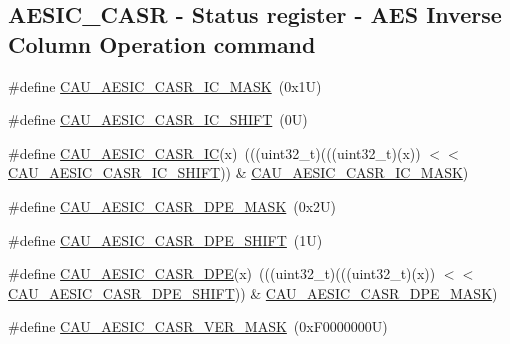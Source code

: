 \subsection*{A\+E\+S\+I\+C\+\_\+\+C\+A\+SR -\/ Status register -\/ A\+ES Inverse Column Operation command}
\begin{DoxyCompactItemize}
\item 
\#define \mbox{\hyperlink{group___c_a_u___register___masks_gacb80d3117440c08ed94005920ea5fb39}{C\+A\+U\+\_\+\+A\+E\+S\+I\+C\+\_\+\+C\+A\+S\+R\+\_\+\+I\+C\+\_\+\+M\+A\+SK}}~(0x1\+U)
\item 
\#define \mbox{\hyperlink{group___c_a_u___register___masks_gaea31527fd7f5ac33f8a4eacdb62ae8bd}{C\+A\+U\+\_\+\+A\+E\+S\+I\+C\+\_\+\+C\+A\+S\+R\+\_\+\+I\+C\+\_\+\+S\+H\+I\+FT}}~(0\+U)
\item 
\#define \mbox{\hyperlink{group___c_a_u___register___masks_ga5950faf1256b1fda0c57d967b32cfcbf}{C\+A\+U\+\_\+\+A\+E\+S\+I\+C\+\_\+\+C\+A\+S\+R\+\_\+\+IC}}(x)~(((uint32\+\_\+t)(((uint32\+\_\+t)(x)) $<$$<$ \mbox{\hyperlink{group___c_a_u___register___masks_gaea31527fd7f5ac33f8a4eacdb62ae8bd}{C\+A\+U\+\_\+\+A\+E\+S\+I\+C\+\_\+\+C\+A\+S\+R\+\_\+\+I\+C\+\_\+\+S\+H\+I\+FT}})) \& \mbox{\hyperlink{group___c_a_u___register___masks_gacb80d3117440c08ed94005920ea5fb39}{C\+A\+U\+\_\+\+A\+E\+S\+I\+C\+\_\+\+C\+A\+S\+R\+\_\+\+I\+C\+\_\+\+M\+A\+SK}})
\item 
\#define \mbox{\hyperlink{group___c_a_u___register___masks_gafd8cf2f0aa0a4475cc5352b023839e02}{C\+A\+U\+\_\+\+A\+E\+S\+I\+C\+\_\+\+C\+A\+S\+R\+\_\+\+D\+P\+E\+\_\+\+M\+A\+SK}}~(0x2\+U)
\item 
\#define \mbox{\hyperlink{group___c_a_u___register___masks_ga45aa7619f775385221648659d5303807}{C\+A\+U\+\_\+\+A\+E\+S\+I\+C\+\_\+\+C\+A\+S\+R\+\_\+\+D\+P\+E\+\_\+\+S\+H\+I\+FT}}~(1\+U)
\item 
\#define \mbox{\hyperlink{group___c_a_u___register___masks_gafa83a6c79cb080610d79ce60d6b99c59}{C\+A\+U\+\_\+\+A\+E\+S\+I\+C\+\_\+\+C\+A\+S\+R\+\_\+\+D\+PE}}(x)~(((uint32\+\_\+t)(((uint32\+\_\+t)(x)) $<$$<$ \mbox{\hyperlink{group___c_a_u___register___masks_ga45aa7619f775385221648659d5303807}{C\+A\+U\+\_\+\+A\+E\+S\+I\+C\+\_\+\+C\+A\+S\+R\+\_\+\+D\+P\+E\+\_\+\+S\+H\+I\+FT}})) \& \mbox{\hyperlink{group___c_a_u___register___masks_gafd8cf2f0aa0a4475cc5352b023839e02}{C\+A\+U\+\_\+\+A\+E\+S\+I\+C\+\_\+\+C\+A\+S\+R\+\_\+\+D\+P\+E\+\_\+\+M\+A\+SK}})
\item 
\#define \mbox{\hyperlink{group___c_a_u___register___masks_ga7c4921877f2a358cf58b360ae349d6e4}{C\+A\+U\+\_\+\+A\+E\+S\+I\+C\+\_\+\+C\+A\+S\+R\+\_\+\+V\+E\+R\+\_\+\+M\+A\+SK}}~(0x\+F0000000\+U)

\end{DoxyCompactItemize}
